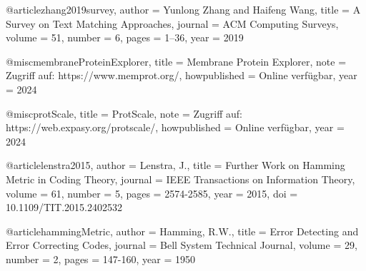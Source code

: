 \documentclass[german,version-2022-01]{uzl-thesis}
\begin{document}
\begin{bibtex-entries}
@article{zhang2019survey,
  author  = {Yunlong Zhang and Haifeng Wang},
  title   = {A Survey on Text Matching Approaches},
  journal = {ACM Computing Surveys},
  volume  = {51},
  number  = {6},
  pages    = {1--36},
  year     = {2019}
}

@misc{membraneProteinExplorer,
  title = {Membrane Protein Explorer},
  note = {Zugriff auf: https://www.memprot.org/},
  howpublished = {Online verf\"ugbar},
  year = {2024}
}

@misc{protScale,
  title = {ProtScale},
  note = {Zugriff auf: https://web.expasy.org/protscale/},
  howpublished = {Online verf\"ugbar},
  year = {2024}
}

@article{lenstra2015,
  author = {Lenstra, J.},
  title = {Further Work on Hamming Metric in Coding Theory},
  journal = {IEEE Transactions on Information Theory},
  volume = {61},
  number = {5},
  pages = {2574-2585},
  year = {2015},
  doi = {10.1109/TIT.2015.2402532}
}

@article{hammingMetric,
  author = {Hamming, R.W.},
  title = {Error Detecting and Error Correcting Codes},
  journal = {Bell System Technical Journal},
  volume = {29},
  number = {2},
  pages = {147-160},
  year = {1950}
}

\end{bibtex-entries}



%
%
%
%
\end{document}

